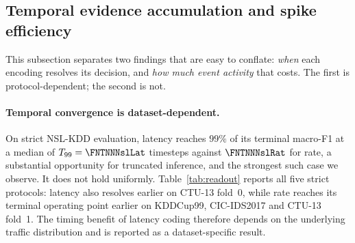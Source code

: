 \subsection{Temporal evidence accumulation and spike efficiency}
\label{sec:res-readout}

This subsection separates two findings that are easy to conflate: \emph{when}
each encoding resolves its decision, and \emph{how much event activity} that
costs. The first is protocol-dependent; the second is not.

\paragraph{Temporal convergence is dataset-dependent.}
On strict NSL-KDD evaluation, latency reaches $99\%$ of its terminal macro-F1 at
a median of $T_{99}=\FNTNNNslLat$ timesteps against $\FNTNNNslRat$ for rate, a substantial opportunity for truncated inference, and the strongest such case
we observe. It does not hold uniformly. Table~\ref{tab:readout} reports all five
strict protocols: latency also resolves earlier on CTU-13 fold~0, while rate
reaches its terminal operating point earlier on KDDCup99, CIC-IDS2017 and CTU-13
fold~1. The timing benefit of latency coding therefore depends on the underlying
traffic distribution and is reported as a dataset-specific result.

\begin{table}[t]
\centering
\caption{Median $T_{95}$ and $T_{99}$ by strict protocol,
\texttt{LeakyParallel}, five seeds. $T_{q}$ is the first timestep reaching
$q\%$ of that configuration's \emph{own} terminal macro-F1; the methodology
defines both thresholds, so both are reported. The \emph{Earlier} column refers
to $T_{99}$. Latency resolves earlier on two protocols and later on three,
so the NSL-KDD result is the strongest case rather than the typical one.}
\label{tab:readout}
\end{table}

